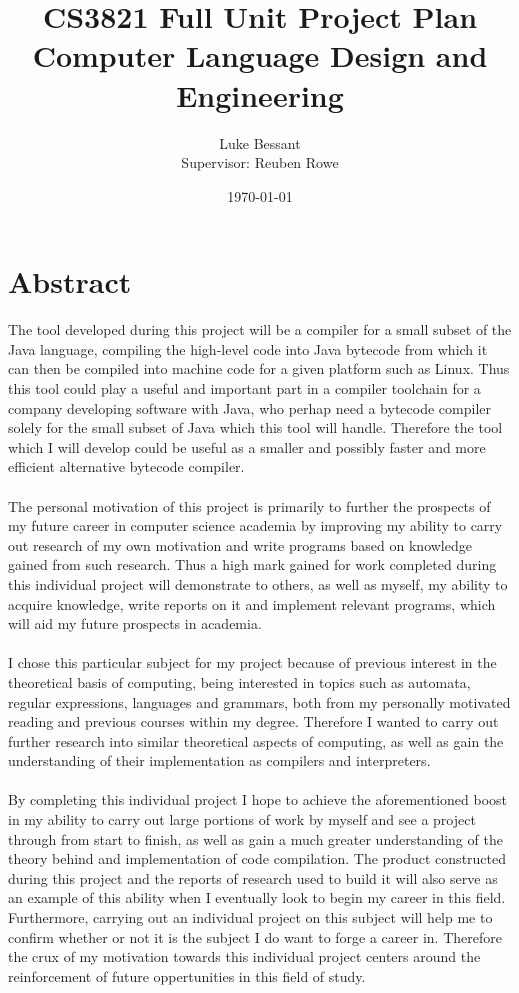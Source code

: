 \documentclass[a4paper, 11pt]{article}
\title{\textbf{CS3821 Full Unit Project Plan}\\Computer Language Design and Engineering}
\author{Luke Bessant\\Supervisor: Reuben Rowe}
\date{\today}
\begin{document}
\maketitle

\thispagestyle{title}

\newpage

\tableofcontents

\newpage

\section{Abstract}
The tool developed during this project will be a compiler for a small subset of the Java language, compiling the high-level code into Java bytecode from which it can then be compiled into machine code for a given platform such as Linux. Thus this tool could play a useful and important part in a compiler toolchain for a company developing software with Java, who perhap need a bytecode compiler solely for the small subset of Java which this tool will handle. Therefore the tool which I will develop could be useful as a smaller and possibly faster and more efficient alternative bytecode compiler.
\\
\\
The personal motivation of this project is primarily to further the prospects of my future career in computer science academia by improving my ability to carry out research of my own motivation and write programs based on knowledge gained from such research. Thus a high mark gained for work completed during this individual project will demonstrate to others, as well as myself, my ability to acquire knowledge, write reports on it and implement relevant programs, which will aid my future prospects in academia.
\\
\\
I chose this particular subject for my project because of previous interest in the theoretical basis of computing, being interested in topics such as automata, regular expressions, languages and grammars, both from my personally motivated reading and previous courses within my degree. Therefore I wanted to carry out further research into similar theoretical aspects of computing, as well as gain the understanding of their implementation as compilers and interpreters.
\\
\\
By completing this individual project I hope to achieve the aforementioned boost in my ability to carry out large portions of work by myself and see a project through from start to finish, as well as gain a much greater understanding of the theory behind and implementation of code compilation. The product constructed during this project and the reports of research used to build it will also serve as an example of this ability when I eventually look to begin my career in this field. Furthermore, carrying out an individual project on this subject will help me to confirm whether or not it is the subject I do want to forge a career in. Therefore the crux of my motivation towards this individual project centers around the reinforcement of future oppertunities in this field of study.
\end{document}
